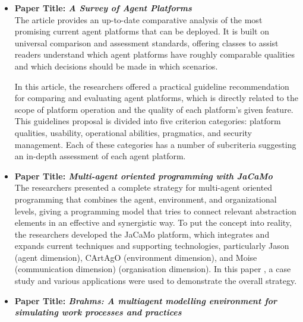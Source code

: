 \begin{itemize}[label={}]
\vspace{.5cm}

\item \textbf{Paper Title: \textit{A Survey of Agent Platforms}}\\

The article \cite{survey} provides an up-to-date comparative analysis of the most promising current agent platforms that can be deployed. It is built on universal comparison and assessment standards, offering classes to assist readers understand which agent platforms have roughly comparable qualities and which decisions should be made in which scenarios.

\vspace{.5cm}

In this article, the researchers offered a practical guideline recommendation for comparing and evaluating agent platforms, which is directly related to the scope of platform operation and the quality of each platform's given feature. This guidelines proposal is divided into five criterion categories: platform qualities, usability, operational abilities, pragmatics, and security management. Each of these categories has a number of subcriteria suggesting an in-depth assessment of each agent platform.

\vspace{.5cm}

\item \textbf{Paper Title: \textit{Multi-agent oriented programming with JaCaMo}}\\

The researchers presented a complete strategy for multi-agent oriented programming that combines the agent, environment, and organizational levels, giving a programming model that tries to connect relevant abstraction elements in an effective and synergistic way. To put the concept into reality, the researchers developed the JaCaMo platform, which integrates and expands current techniques and supporting technologies, particularly Jason (agent dimension), CArtAgO (environment dimension), and Moise (communication dimension) (organisation dimension).  In this paper \cite{Jacamo}, a case study and various applications were used to demonstrate the overall strategy.

\vspace{.5cm}

\item \textbf{Paper Title: \textit{Brahms: A multiagent modelling environment for simulating work processes and practices}}\\


\end{itemize}
